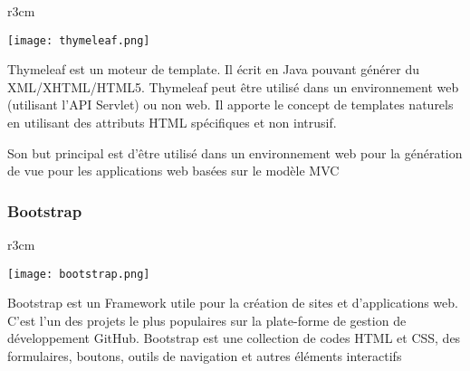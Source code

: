 \documentclass[../rapportdestage.tex]{subfiles}
\begin{document}
    \begin{wrapfigure}[4]{r}{3cm}

\texttt{[image: thymeleaf.png]}
 
  
\end{wrapfigure}	
	Thymeleaf est un moteur de template. Il écrit en Java pouvant générer du XML/XHTML/HTML5.
Thymeleaf peut être utilisé dans un environnement web (utilisant l’API Servlet) ou non web.
Il apporte le concept de templates naturels en utilisant des attributs HTML spécifiques et non
intrusif.

Son but principal est d’être utilisé dans un environnement web pour la génération de vue pour les
applications web basées sur le modèle MVC	
	
	\subsubsection{Bootstrap}
	
    \begin{wrapfigure}[4]{r}{3cm}

\texttt{[image: bootstrap.png]}
  
  
\end{wrapfigure}
	Bootstrap est un Framework utile pour la création de sites et d’applications web. C’est l’un des projets le plus populaires sur la plate-forme de gestion de développement GitHub. Bootstrap est une collection de codes HTML et CSS, des formulaires, boutons, outils de navigation et autres éléments interactifs
	
	
	
	
\end{document}
